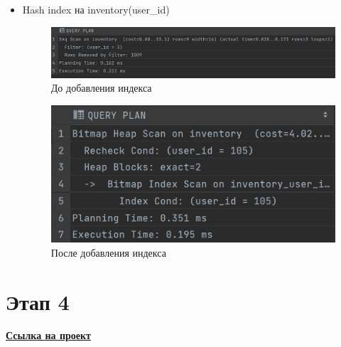 \begin{itemize}
    \item Hash index на inventory(user\_id)
    \begin{figure}[H]
	\begin{center}
		\includegraphics[scale=0.8]{images/inventory_user_id_before.jpg}
            \caption{До добавления индекса}
	\end{center}
    \end{figure}
    \begin{figure}[H]
	\begin{center}
		\includegraphics[scale=1]{images/inventory_user_id_after.jpg}
            \caption{После добавления индекса}
	\end{center}
    \end{figure}

\end{itemize}

\section*{Этап 4}


\faGithub\href{https://github.com/orgs/Vakzu/repositories}{\textbf{Ссылка на проект}}
